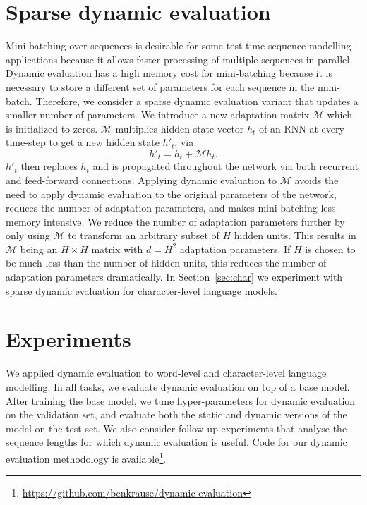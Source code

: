 \documentclass{article} \usepackage{iclr2018_conference,times}
\begin{document}
\section{Sparse dynamic evaluation}
\label{sec:mem}


Mini-batching over sequences is desirable for some test-time sequence modelling applications because it allows faster processing of multiple sequences in parallel. Dynamic evaluation has a high memory cost for mini-batching because it is necessary to store a different set of parameters for each sequence in the mini-batch. Therefore, we consider a sparse dynamic evaluation variant that updates a smaller number of parameters. We introduce a new adaptation matrix $\mathcal{M}$ which is initialized to zeros. $\mathcal{M}$ multiplies hidden state vector $h_t$ of an RNN at every time-step to get a new hidden state $h'_t$, via
\begin{equation}
h'_t = h_t + \mathcal{M} h_t .
\end{equation}
$h'_t$ then replaces $h_t$ and is propagated throughout the network via both recurrent and feed-forward connections. Applying dynamic evaluation to $\mathcal{M}$ avoids the need to apply dynamic evaluation to the original parameters of the network, reduces the number of adaptation parameters, and makes mini-batching less memory intensive. We reduce the number of adaptation parameters further by only using $\mathcal{M}$ to transform an arbitrary subset of $H$ hidden units. This results in $\mathcal{M}$ being an $H\!\times\!H$ matrix with $d=H^2$ adaptation parameters. If $H$ is chosen to be much less than the number of hidden units, this reduces the number of adaptation parameters dramatically. In Section~\ref{sec:char} we experiment with sparse dynamic evaluation for character-level language models.



\section{Experiments}

We applied dynamic evaluation to word-level and character-level language modelling.  In all tasks, we evaluate dynamic evaluation on top of a base model. After training the base model, we tune hyper-parameters for dynamic evaluation on the validation set, and evaluate both the static and dynamic versions of the model on the test set. We also consider follow up experiments that analyse the sequence lengths for which dynamic evaluation is useful. Code for our dynamic evaluation methodology is available\footnote{\url{https://github.com/benkrause/dynamic-evaluation}}.
\end{document}
